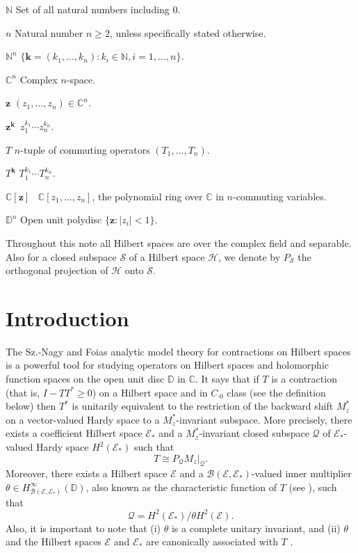 \documentclass[12pt]{amsart}
\begin{document}
\begin{list}{\quad}{}
\item $\mathbb{N}$ \quad \quad \; Set of all natural numbers
including 0.

\item $n$ \quad \quad \; Natural number $n \geq 2$, unless
specifically stated otherwise.
\item $\mathbb{N}^n$ \quad \quad $\{\bm{k} = (k_1, \ldots, k_n) : k_i \in \mathbb{N}, i = 1,
\ldots, n\}$.
\item $\mathbb{C}^n$  \quad \quad Complex $n$-space.
\item $\bm{z}$ \quad \quad \; $(z_1, \ldots, z_n) \in \mathbb{C}^n$.
\item $\bm{z}^{\bm{k}}$ \quad \quad \,$z_1^{k_1}\cdots
z_n^{k_n}$.
\item $T$ \quad \quad \; $n$-tuple of commuting operators $(T_1, \ldots, T_n)$.
\item $T^{\bm{k}}$ \quad \quad $T_1^{k_1} \cdots
T_n^{k_n}$.
\item $\mathbb{C}[{\bm{z}}]$  \quad \, $\mathbb{C}[z_1, \ldots, z_n]$,
the polynomial ring over $\mathbb{C}$ in $n$-commuting variables.
\item $\mathbb{D}^n$  \quad \quad Open unit polydisc $\{{\bm{z}} : |z_i|
<1\}$.
\end{list}

Throughout this note all Hilbert spaces are over the complex field
and separable. Also for a closed subspace ${\mathcal{S}}$ of a Hilbert space
${\mathcal{H}}$, we denote by $P_{\mathcal{S}}$ the orthogonal projection of ${\mathcal{H}}$
onto ${\mathcal{S}}$.

{\setcounter{equation}{0} \section{{Introduction}}}

The Sz.-Nagy and Foias analytic model theory for contractions on
Hilbert spaces is a powerful tool for studying operators on Hilbert
spaces and holomorphic function spaces on the open unit disc ${\mathbb{D}}$ in
${\mathbb{C}}$. It says that if $T$ is a contraction (that is, $I - T T^* \geq
0$) on a Hilbert space and in $C_{\cdot 0}$ class (see the
definition below) then $T^*$ is unitarily equivalent to the
restriction of the backward shift $M_z^*$ on a vector-valued Hardy
space to a $M_z^*$-invariant subspace. More precisely, there exists
a coefficient Hilbert space ${\mathcal{E}}_*$ and a $M_z^*$-invariant closed
subspace ${\mathcal{Q}}$ of ${\mathcal{E}}_*$-valued Hardy space $H^2({\mathcal{E}}_*)$ such
that \[T \cong P_{\mathcal{Q}} M_z|_{\mathcal{Q}}.\] Moreover, there exists a
Hilbert space ${\mathcal{E}}$ and a ${\mathcal{B}}({\mathcal{E}}, {\mathcal{E}}_*)$-valued inner
multiplier $\theta \in H^\infty_{{\mathcal{B}}({\mathcal{E}}, {\mathcal{E}}_*)}({\mathbb{D}})$, also
known as the characteristic function of $T$ (see \cite{NF}), such
that
\[{\mathcal{Q}} = H^2({\mathcal{E}}_*)/\theta H^2({\mathcal{E}}).\] Also, it is important to
note that (i) $\theta$ is a complete unitary invariant, and (ii)
$\theta$ and the Hilbert spaces ${\mathcal{E}}$ and ${\mathcal{E}}_*$ are canonically
associated with $T$ \cite{NF}.
\end{document}
